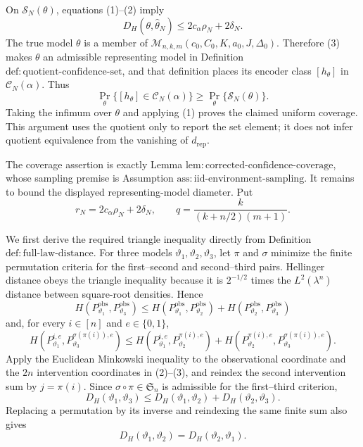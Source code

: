 On \(\mathcal S_N(\theta)\), equations (1)--(2) imply
\[
 D_H(\theta,\widehat\theta_N)
 \leq2c_\alpha\rho_N+2\delta_N.
\tag{3}
\]
The true model \(\theta\) is a member of \(\mathcal M_{n,k,m}(c_0,C_0,K,a_0,J,\Delta_0)\).  Therefore (3) makes \(\theta\) an admissible representing model in Definition \(\mathrm{def:quotient\text{-}confidence\text{-}set}\), and that definition places its encoder class \([h_\theta]\) in \(\mathcal C_N(\alpha)\).  Thus
\[
 \Pr_\theta\{[h_\theta]\in\mathcal C_N(\alpha)\}
 \geq\Pr_\theta\{\mathcal S_N(\theta)\}.
\]
Taking the infimum over \(\theta\) and applying (1) proves the claimed uniform coverage.  This argument uses the quotient only to report the set element; it does not infer quotient equivalence from the vanishing of \(d_{\mathrm{rep}}\).

The coverage assertion is exactly Lemma \(\mathrm{lem:corrected\text{-}confidence\text{-}coverage}\), whose sampling premise is Assumption \(\mathrm{ass:iid\text{-}environment\text{-}sampling}\).  It remains to bound the displayed representing-model diameter.  Put
\[
 r_N=2c_\alpha\rho_N+2\delta_N,
 \qquad
 q=\frac{k}{(k+n/2)(m+1)}.
\tag{1}
\]

We first derive the required triangle inequality directly from Definition \(\mathrm{def:full\text{-}law\text{-}distance}\).  For three models \(\vartheta_1,\vartheta_2,\vartheta_3\), let \(\pi\) and \(\sigma\) minimize the finite permutation criteria for the first--second and second--third pairs.  Hellinger distance obeys the triangle inequality because it is \(2^{-1/2}\) times the \(L^2(\lambda^n)\) distance between square-root densities.  Hence
\[
 H(P_{\vartheta_1}^{\mathrm{obs}},P_{\vartheta_3}^{\mathrm{obs}})
 \leq H(P_{\vartheta_1}^{\mathrm{obs}},P_{\vartheta_2}^{\mathrm{obs}})
     +H(P_{\vartheta_2}^{\mathrm{obs}},P_{\vartheta_3}^{\mathrm{obs}})
\tag{2}
\]
and, for every \(i\in[n]\) and \(e\in\{0,1\}\),
\[
 H(P_{\vartheta_1}^{i,e},P_{\vartheta_3}^{\sigma(\pi(i)),e})
 \leq H(P_{\vartheta_1}^{i,e},P_{\vartheta_2}^{\pi(i),e})
     +H(P_{\vartheta_2}^{\pi(i),e},P_{\vartheta_3}^{\sigma(\pi(i)),e}).
\tag{3}
\]
Apply the Euclidean Minkowski inequality to the observational coordinate and the \(2n\) intervention coordinates in (2)--(3), and reindex the second intervention sum by \(j=\pi(i)\).  Since \(\sigma\circ\pi\in\mathfrak S_n\) is admissible for the first--third criterion,
\[
 D_H(\vartheta_1,\vartheta_3)
 \leq D_H(\vartheta_1,\vartheta_2)+D_H(\vartheta_2,\vartheta_3).
\tag{4}
\]
Replacing a permutation by its inverse and reindexing the same finite sum also gives
\[
 D_H(\vartheta_1,\vartheta_2)=D_H(\vartheta_2,\vartheta_1).
\tag{5}
\]

